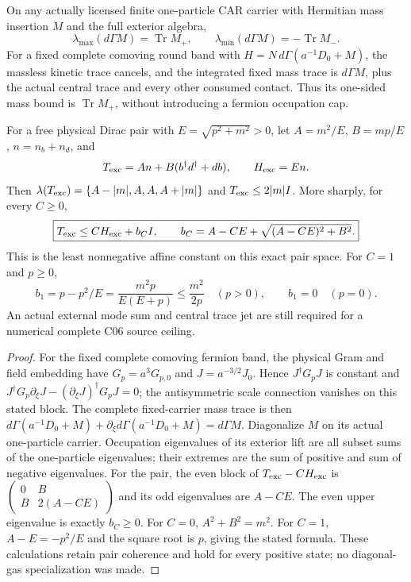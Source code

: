 \documentclass[12pt,a4paper]{article}
\begin{document}
\begin{proposition}
\label{p8:prop:v2189-c06-CAR-upper}
On any actually licensed finite one-particle CAR carrier with Hermitian
mass insertion $M$ and the full exterior algebra,
\[
 \lambda_{\max}(d\Gamma M)=\operatorname{Tr}M_+,
 \qquad \lambda_{\min}(d\Gamma M)=-\operatorname{Tr}M_-.
\]
For a fixed complete comoving round band with
$H=N\,d\Gamma(a^{-1}D_0+M)$, the massless kinetic trace cancels, and
the integrated fixed mass trace is $d\Gamma M$, plus the actual central
trace and every other consumed contact. Thus its one-sided mass bound is
$\operatorname{Tr}M_+$, without introducing a fermion occupation cap.

For a free physical Dirac pair with $E=\sqrt{p^2+m^2}>0$, let
$A=m^2/E$, $B=mp/E$, $n=n_b+n_d$, and
\[
 T_{\rm exc}=An+B(b^\dagger d^\dagger+db),\qquad
 H_{\rm exc}=En.
\]
Then $\lambda(T_{\rm exc})=\{A-|m|,A,A,A+|m|\}$ and
$T_{\rm exc}\le2|m|I$. More sharply, for every $C\ge0$,
\[
 \boxed{T_{\rm exc}\le C H_{\rm exc}+b_C I,\qquad
 b_C=A-CE+\sqrt{(A-CE)^2+B^2}.}
\]
This is the least nonnegative affine constant on this exact pair space.
For $C=1$ and $p\ge0$,
\[
 b_1=p-p^2/E=\frac{m^2p}{E(E+p)}\le\frac{m^2}{2p}\quad(p>0),
 \qquad b_1=0\quad(p=0).
\]
An actual external mode sum and central trace jet are still required for
a numerical complete C06 source ceiling.
\end{proposition}
\begin{proof}
For the fixed complete comoving fermion band, the physical Gram and field
embedding have $G_p=a^3G_{p,0}$ and $J=a^{-3/2}J_0$. Hence
$J^\dagger G_pJ$ is constant and
$J^\dagger G_p\partial_\xi J-(\partial_\xi J)^\dagger G_pJ=0$;
the antisymmetric scale connection vanishes on this stated block. The
complete fixed-carrier mass trace is then
$d\Gamma(a^{-1}D_0+M)+\partial_\xi d\Gamma(a^{-1}D_0+M)=d\Gamma M$.
Diagonalize $M$ on its actual one-particle carrier. Occupation eigenvalues
of its exterior lift are all subset sums of the one-particle eigenvalues;
their extremes are the sum of positive and sum of negative eigenvalues.
For the pair, the even block of $T_{\rm exc}-CH_{\rm exc}$ is
$\left(\begin{smallmatrix}0&B\\B&2(A-CE)\end{smallmatrix}\right)$
and its odd eigenvalues are $A-CE$. The even upper eigenvalue is exactly
$b_C\ge0$. For $C=0$, $A^2+B^2=m^2$. For $C=1$,
$A-E=-p^2/E$ and the square root is $p$, giving the stated formula.
These calculations retain pair coherence and hold for every positive
state; no diagonal-gas specialization was made.
\end{proof}
\end{document}
